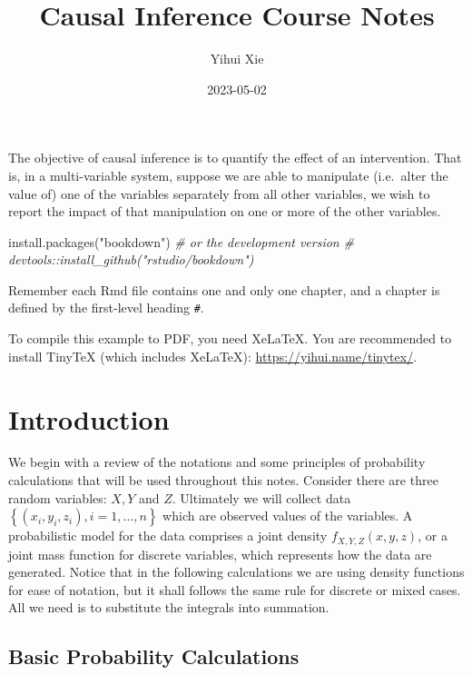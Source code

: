 \documentclass[
]{book}
\title{Causal Inference Course Notes}
\author{Yihui Xie}
\date{2023-05-02}
\newenvironment{Shaded}{\begin{snugshade}}{\end{snugshade}}
\newcommand{\CommentTok}[1]{\textcolor[rgb]{0.56,0.35,0.01}{\textit{#1}}}
\newcommand{\FunctionTok}[1]{\textcolor[rgb]{0.00,0.00,0.00}{#1}}
\newcommand{\NormalTok}[1]{#1}
\newcommand{\StringTok}[1]{\textcolor[rgb]{0.31,0.60,0.02}{#1}}
\begin{document}
\maketitle

{
\setcounter{tocdepth}{1}
\tableofcontents
}
The objective of causal inference is to quantify the effect of an intervention. That is, in a multi-variable system, suppose we are able to manipulate (i.e.~alter the value of) one of the variables separately from all other variables, we wish to report the impact of that manipulation on one or more of the other variables.

\begin{Shaded}
\begin{Highlighting}[]
\FunctionTok{install.packages}\NormalTok{(}\StringTok{"bookdown"}\NormalTok{)}
\CommentTok{\# or the development version}
\CommentTok{\# devtools::install\_github("rstudio/bookdown")}
\end{Highlighting}
\end{Shaded}

Remember each Rmd file contains one and only one chapter, and a chapter is defined by the first-level heading \texttt{\#}.

To compile this example to PDF, you need XeLaTeX. You are recommended to install TinyTeX (which includes XeLaTeX): \url{https://yihui.name/tinytex/}.

\hypertarget{intro}{%
\chapter{Introduction}\label{intro}}

We begin with a review of the notations and some principles of probability calculations that will be used throughout this notes. Consider there are three random variables: \(X, Y\) and \(Z\). Ultimately we will collect data \(\left\{\left(x_i, y_i, z_i\right), i=1, \ldots, n\right\}\) which are observed values of the variables. A probabilistic model for the data comprises a joint density \(f_{X,Y,Z} (x,y,z)\), or a joint mass function for discrete variables, which represents how the data are generated. Notice that in the following calculations we are using density functions for ease of notation, but it shall follows the same rule for discrete or mixed cases. All we need is to substitute the integrals into summation.

\hypertarget{basic-probability-calculations}{%
\section{Basic Probability Calculations}\label{basic-probability-calculations}}
\end{document}
